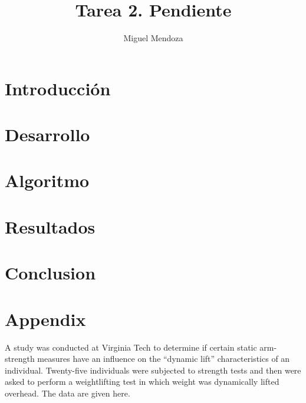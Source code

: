 \documentclass[10pt]{IEEEtran}
\title{Tarea 2. Pendiente }
\author{Miguel Mendoza}
\begin{document}
\maketitle

\section{Introducci\'on}

\section{Desarrollo}

\section{Algoritmo}

\section{Resultados}


\section{Conclusion}


\section{Appendix}
A study was conducted at Virginia Tech to determine if certain static arm-strength measures have an influence on the “dynamic lift” characteristics of an individual. Twenty-five individuals were subjected to strength tests and then were asked to perform a weightlifting test in which weight was dynamically lifted overhead. The data are given here.\\
\end{document}
